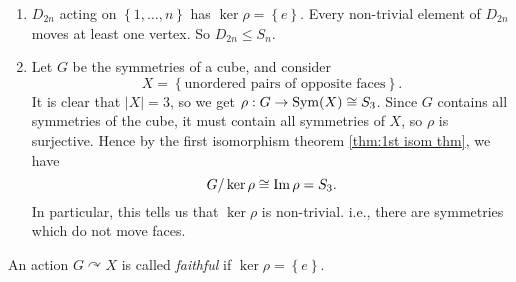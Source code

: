 \documentclass[a4paper]{article}
\begin{document}
        \begin{example}
            \begin{enumerate}
                \item $ D_{2n} $ acting on $ \left\{ 1,\dots,n\right\} $ has $ \ker \rho=\left\{ e\right\} $. Every non-trivial element of $ D_{2n} $ moves at least one vertex. So $ D_{2n}\le S_n $.
                \item Let $G$ be the symmetries of a cube, and consider
                \[
                    X=\left\{ \text{unordered pairs of opposite faces}\right\}
                .\]
                It is clear that $ |X|=3 $, so we get $ \rho:G\to \operatorname{Sym}(X) \cong S_3 $. Since $G$ contains all symmetries of the cube, it must contain all symmetries of $X$, so $\rho$ is surjective. Hence by the first isomorphism theorem \ref{thm:1st isom thm}, we have 
                \[
                    G/\ker \rho \cong \operatorname{Im} \rho = S_3
                .\]
                In particular, this tells us that $ \ker \rho $ is non-trivial. i.e., there are symmetries which do not move faces.
            \end{enumerate}
        \end{example}
        \begin{definition}
            An action $ G \curvearrowright X $ is called \textit{faithful} if $ \ker \rho = \left\{ e\right\} $.
        \end{definition}
\end{document}
